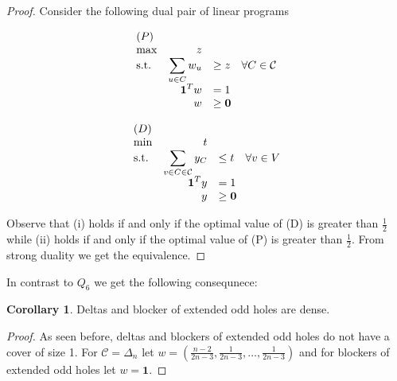 \documentclass[a4paper, 12pt, twoside=false]{scrbook}
\theoremstyle{definition}
\newtheorem{corollary}[theorem]{Corollary}
\begin{document}
\begin{proof}
    Consider the following dual pair of linear programs
    \newline
    \newline
    \begin{minipage}{.5\linewidth}
        \begin{equation*}
            \begin{array}{l@{\quad} r l l}
                (P)\\
                \max          &z   \\
                \mathrm{s.t.}  &\displaystyle\sum\limits_{u\in C} w_u &\geq  z \quad \forall C \in \mathcal{C} \\
                    & \textbf{1}^Tw &=   1 \\
                    &   w &\geq   \textbf{0}
            \end{array}
        \end{equation*}
    \end{minipage}
    \begin{minipage}{.5\linewidth}
        \begin{equation*}
            \begin{array}{l@{\quad} r l l}
                (D)\\
                \min          &t   \\
                \mathrm{s.t.}  &\displaystyle\sum\limits_{v \in C \in \mathcal{C}} y_C &\leq  t \quad \forall v \in V \\
                    & \textbf{1}^Ty &=   1 \\
                    &   y &\geq   \textbf{0}
            \end{array}
        \end{equation*}
    \end{minipage}
    \newline
    \newline
    Observe that (i) holds if and only if the optimal value of (D) is greater than $\frac 12$ while (ii) holds if and only if the optimal value of (P) is greater than $\frac 12$.
    From strong duality we get the equivalence.
\end{proof}

In contrast to $Q_6$ we get the following consequnece:
\begin{corollary}
    Deltas and blocker of extended odd holes are dense.
\end{corollary}

\begin{proof}
    As seen before, deltas and blockers of extended odd holes do not have a cover of size 1.
    For $\mathcal{C}=\Delta_n$ let $w=\left(\frac{n-2}{2n-3}, \frac 1{2n-3}, \ldots, \frac 1{2n-3}\right)$ and for blockers of extended odd holes let $w=\textbf{1}$.
\end{proof}
\end{document}

